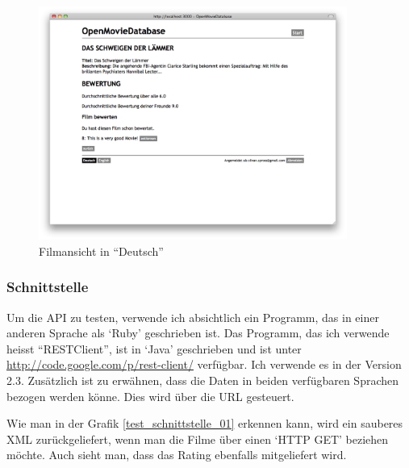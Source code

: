 \begin{figure}[ht]
    \begin{center}
        \includegraphics[width=0.9\textwidth,angle=0]{./bilder/tests/test_internationalisierung_02.png}
        \caption{Filmansicht in ``Deutsch''}
        \label{test_internationalisierung_02}
    \end{center}
\end{figure}

\clearpage

\subsubsection{Schnittstelle}
Um die API zu testen, verwende ich absichtlich ein Programm, das in einer
anderen Sprache als `Ruby' geschrieben ist. Das Programm, das ich verwende
heisst ``RESTClient'', ist in `Java' geschrieben und ist unter 
\url{http://code.google.com/p/rest-client/} verfügbar. Ich verwende es in der 
Version 2.3. Zusätzlich ist zu erwähnen, dass die Daten in beiden verfügbaren
Sprachen bezogen werden könne. Dies wird über die URL gesteuert. 

Wie man in der Grafik \ref{test_schnittstelle_01} erkennen kann, wird ein
sauberes XML zurückgeliefert, wenn man die Filme über einen `HTTP GET' beziehen 
möchte. Auch sieht man, dass das Rating ebenfalls mitgeliefert wird.

